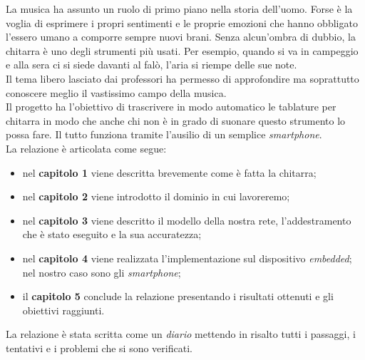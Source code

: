 La musica ha assunto un ruolo di primo piano nella storia dell'uomo. Forse è la voglia di esprimere i propri sentimenti e le proprie emozioni che hanno obbligato l'essero umano a comporre sempre nuovi brani. Senza alcun'ombra di dubbio, la chitarra è uno degli strumenti più usati. Per esempio, quando si va in campeggio e alla sera ci si siede davanti al falò, l'aria si riempe delle sue note.\\ Il tema libero lasciato dai professori ha permesso di approfondire ma soprattutto conoscere meglio il vastissimo campo della musica.  \\ Il progetto ha l'obiettivo di trascrivere in modo automatico le tablature per chitarra in modo che anche chi non è in grado di suonare questo strumento lo possa fare. Il tutto funziona tramite l'ausilio di un semplice \textit{smartphone}. \\

La relazione è articolata come segue:
\begin{itemize}
	\item nel \textbf{capitolo 1} viene descritta brevemente come è fatta la chitarra;
	\item nel \textbf{capitolo 2} viene introdotto il dominio in cui lavoreremo;
	\item nel \textbf{capitolo 3} viene descritto il modello della nostra rete, l'addestramento che è stato eseguito e la sua accuratezza;
	\item nel \textbf{capitolo 4} viene realizzata l'implementazione sul dispositivo \textit{embedded}; nel nostro caso sono gli \textit{smartphone};
	\item il \textbf{capitolo 5} conclude la relazione presentando i risultati ottenuti e gli obiettivi raggiunti.
\end{itemize}
La relazione è stata scritta come un \textit{diario} mettendo in risalto tutti i passaggi, i tentativi e i problemi che si sono verificati.